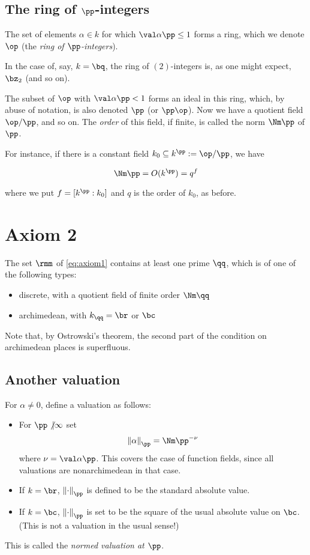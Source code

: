 \subsection{The ring of $\pp$-integers}
\label{subsec:ring-of-integers}
The set of elements $\alpha\in k$ for which $\val\alpha\pp \leq 1$ forms a
ring, which we denote $\op$ (the \textit{ring of $\pp$-integers}).

\begin{example}
  In the case of, say, $k = \bq$, the ring of $(2)$-integers is, as one might
  expect, $\bz_2$ (and so on).
\end{example}
The subset of $\op$ with $\val\alpha\pp < 1$ forms an ideal in this ring, which,
by abuse of notation, is also denoted $\pp$ (or $\pp\op$). Now we have a
quotient field $\op/\pp$, and so on. The \emph{order} of this field, if finite,
is called the norm $\Nm\pp$ of $\pp$.

For instance, if there is a constant field $k_0 \subseteq k^{\pp} := \op/\pp$, we
have

\[ \Nm\pp = O(k^\pp) = q^f \]

where we put $f = {[k^\pp : k_0]}$ and $q$ is the order of $k_0$, as before.

\section{Axiom 2}
\label{sub:axiom2}
\begin{axiom}
  \label{eq:axiom2}
  The set $\rmm$ of \ref{eq:axiom1} contains at least one prime $\qq$, which is of
  one of the following types:
  \begin{itemize}
  \item discrete, with a quotient field of finite order $\Nm\qq$
  \item archimedean, with $k_\qq=\br$ or $\bc$
  \end{itemize}
\end{axiom}
Note that, by Ostrowski's theorem, the second part of the condition on
archimedean places is superfluous.

\subsection{Another valuation}
\label{sec:orgheadline21}
For $\alpha\neq 0$, define a valuation as follows:
\begin{itemize}
\item For $\pp \not | \infty$ set
  \[ { \left\lVert \alpha \right\rVert }_\pp = { \Nm\pp^{-\nu} } \]
  where $\nu = \val \alpha \pp$. This covers the case of function fields, since
  all valuations are nonarchimedean in that case.
\item If $k=\br$, $\left\lVert \cdot \right\rVert_\pp$ is defined to be the
  standard absolute value.
\item If $k=\bc$, $\left\lVert \cdot \right\rVert_\pp$ is set to be the square
  of the usual absolute value on $\bc$. (This is not a valuation in the usual
  sense!)
\end{itemize}
This is called the \textit{normed valuation at $\pp$}.

